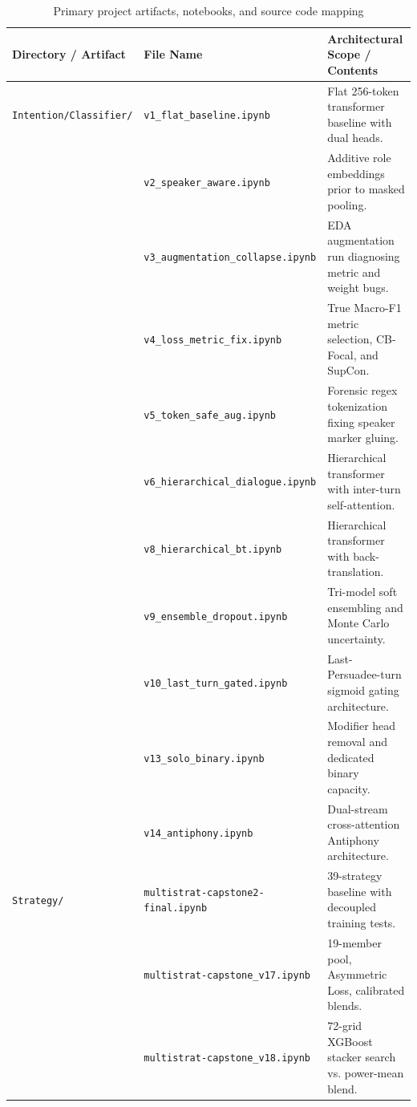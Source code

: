 \begin{table}[htbp]
  \centering
  \small
  \caption{Primary project artifacts, notebooks, and source code mapping}
  \label{tab:app-repo-map}
  \begin{tabularx}{\textwidth}{lp{}Y}
    \toprule
    \textbf{Directory / Artifact} & \textbf{File Name} & \textbf{Architectural Scope / Contents} \\
    \midrule
    \texttt{Intention/Classifier/} & \texttt{v1\_flat\_baseline.ipynb} & Flat 256-token transformer baseline with dual heads. \\
    & \texttt{v2\_speaker\_aware.ipynb} & Additive role embeddings prior to masked pooling. \\
    & \texttt{v3\_augmentation\_collapse.ipynb} & EDA augmentation run diagnosing metric and weight bugs. \\
    & \texttt{v4\_loss\_metric\_fix.ipynb} & True Macro-F1 metric selection, CB-Focal, and SupCon. \\
    & \texttt{v5\_token\_safe\_aug.ipynb} & Forensic regex tokenization fixing speaker marker gluing. \\
    & \texttt{v6\_hierarchical\_dialogue.ipynb} & Hierarchical transformer with inter-turn self-attention. \\
    & \texttt{v8\_hierarchical\_bt.ipynb} & Hierarchical transformer with back-translation. \\
    & \texttt{v9\_ensemble\_dropout.ipynb} & Tri-model soft ensembling and Monte Carlo uncertainty. \\
    & \texttt{v10\_last\_turn\_gated.ipynb} & Last-Persuadee-turn sigmoid gating architecture. \\
    & \texttt{v13\_solo\_binary.ipynb} & Modifier head removal and dedicated binary capacity. \\
    & \texttt{v14\_antiphony.ipynb} & Dual-stream cross-attention Antiphony architecture. \\
    \midrule
    \texttt{Strategy/} & \texttt{multistrat-capstone2-final.ipynb} & 39-strategy baseline with decoupled training tests. \\
    & \texttt{multistrat-capstone\_v17.ipynb} & 19-member pool, Asymmetric Loss, calibrated blends. \\
    & \texttt{multistrat-capstone\_v18.ipynb} & 72-grid XGBoost stacker search vs. power-mean blend. \\

\end{tabularx}
\end{table}
